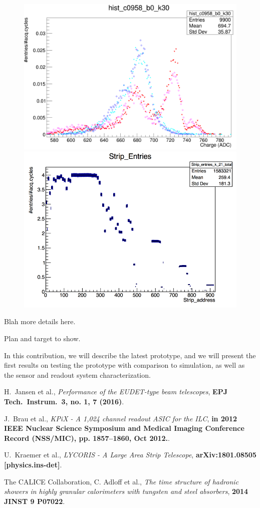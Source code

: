 \begin{figure}[!ht]%
\centering
\includegraphics[width=0.49\linewidth]{pics/hist1.jpg}
\includegraphics[width=0.49\linewidth]{pics/S58_K2_2018_05_07_16_49_42_strip_entries.png}
\caption{}%
\label{fig:2figs}%
\end{figure}

Blah more details here.

Plan and target to show.

In this contribution, we will describe the latest \lycoris prototype, and we will present the first results on testing the prototype with comparison to simulation, as well as the sensor and readout system characterization.

\footnotesize
\begin{thebibliography}{1}

 H.~Jansen et al., {\em Performance of the EUDET-type beam telescopes},
\textbf{EPJ Tech.\ Instrum.\  {\bf 3}, no. 1, 7 (2016)}.

 J.~Brau et al., {\em KPiX - A 1,024 channel readout ASIC for the ILC},
\textbf{in 2012 IEEE Nuclear Science Symposium and Medical Imaging Conference Record (NSS/MIC), pp. 1857–1860, Oct 2012.}.

 U.~Kraemer et al., {\em LYCORIS - A Large Area Strip Telescope},
\textbf{arXiv:1801.08505 [physics.ins-det]}.


 The CALICE Collaboration, C. Adloff et al., {\em The time structure of hadronic showers in highly granular calorimeters with tungsten and
steel absorbers}, \textbf{2014 JINST 9 P07022}.

\end{thebibliography}


